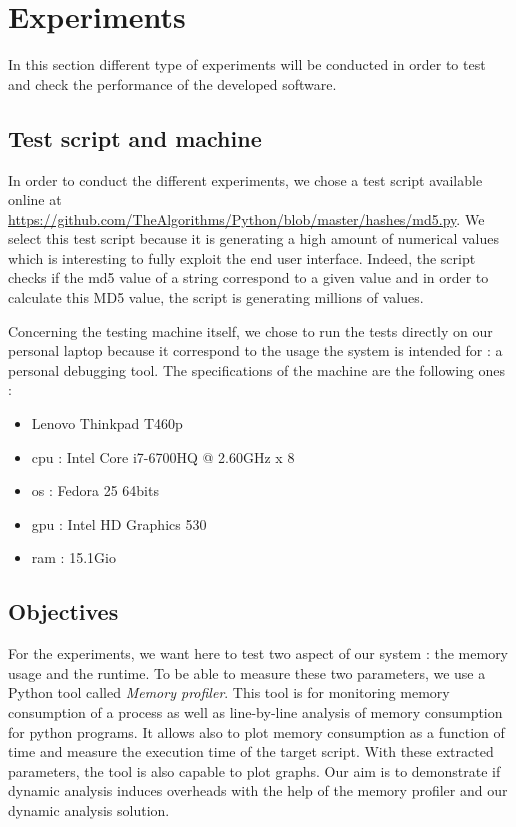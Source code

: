 

\chapter{Experiments} %
\label{chap:experiments}

In this section different type of experiments will be conducted in order to test and check the performance of the developed software.

\section{Test script and machine}
In order to conduct the different experiments, we chose a test script available online at \url{https://github.com/TheAlgorithms/Python/blob/master/hashes/md5.py}. We select this test script because it is generating a high amount of numerical values which is interesting to fully exploit the end user interface. Indeed, the script checks if the \gls{md5} value of a string correspond to a given value and in order to calculate this MD5 value, the script is generating millions of values.

Concerning the testing machine itself, we chose to run the tests directly on our personal laptop because it correspond to the usage the system is intended for : a personal debugging tool. The specifications of the machine are the following ones :
\begin{itemize}
  \item Lenovo Thinkpad T460p
  \item \gls{cpu} : Intel Core i7-6700HQ @ 2.60GHz x 8
  \item \gls{os} : Fedora 25 64bits
  \item \gls{gpu} : Intel HD Graphics 530
  \item \gls{ram} : 15.1Gio
\end{itemize}

\section{Objectives}
For the experiments, we want here to test two aspect of our system : the memory usage and the runtime. To be able to measure these two parameters, we use a Python tool called \textit{Memory profiler}. This tool is for monitoring memory consumption of a process as well as line-by-line analysis of memory consumption for python programs. It allows also to plot memory consumption as a function of time and measure the execution time of the target script. With these extracted parameters, the tool is also capable to plot graphs. Our aim is to demonstrate if dynamic analysis induces overheads with the help of the memory profiler and our dynamic analysis solution.

